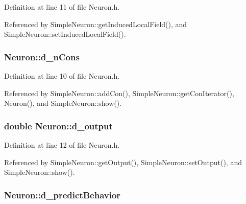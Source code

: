 Definition at line 11 of file Neuron.h.



Referenced by SimpleNeuron::getInducedLocalField(), and SimpleNeuron::setInducedLocalField().

\hypertarget{class_neuron_ac3cb61c8582bb07bb3c61fe9fa07489b}{
\subsubsection[{d\_\-nCons}]{ {\bf Neuron::d\_\-nCons}}}
\label{class_neuron_ac3cb61c8582bb07bb3c61fe9fa07489b}


Definition at line 10 of file Neuron.h.



Referenced by SimpleNeuron::addCon(), SimpleNeuron::getConIterator(), Neuron(), and SimpleNeuron::show().

\hypertarget{class_neuron_a1e0b130755580b323da98c5332a6610e}{
\subsubsection[{d\_\-output}]{\setlength{\rightskip}{0pt plus 5cm}double {\bf Neuron::d\_\-output}}}
\label{class_neuron_a1e0b130755580b323da98c5332a6610e}


Definition at line 12 of file Neuron.h.



Referenced by SimpleNeuron::getOutput(), SimpleNeuron::setOutput(), and SimpleNeuron::show().

\hypertarget{class_neuron_a2522e221f58c84bd3a1c32647da4a411}{
\subsubsection[{d\_\-predictBehavior}]{ {\bf Neuron::d\_\-predictBehavior}}}
\label{class_neuron_a2522e221f58c84bd3a1c32647da4a411}


